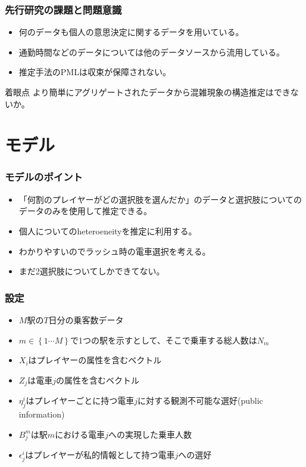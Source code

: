 \documentclass[dvipdfmx, 12pt]{beamer}
\begin{document}
\begin{frame}\frametitle{先行研究の課題と問題意識}
	\begin{itemize}
		\item 何のデータも個人の意思決定に関するデータを用いている。
		\item 通勤時間などのデータについては他のデータソースから流用している。
		\item 推定手法のPMLは収束が保障されない。
	\end{itemize}
	
	\begin{itembox}[l]{着眼点}
	より簡単にアグリゲートされたデータから混雑現象の構造推定はできないか。
	\end{itembox}
\end{frame}


\section{モデル}
\begin{frame}\frametitle{モデルのポイント}
	\begin{itemize}
		\item 「何割のプレイヤーがどの選択肢を選んだか」のデータと選択肢についてのデータのみを使用して推定できる。
		\item 個人についてのheteroeneityを推定に利用する。
		\item わかりやすいのでラッシュ時の電車選択を考える。
		\item まだ2選択肢についてしかできてない。
	\end{itemize}
\end{frame}

\begin{frame}\frametitle{設定}
	\begin{itemize}
		\item $M$駅の$T$日分の乗客数データ
		\item $m \in \left\{1\cdots M \right\}$で1つの駅を示すとして、そこで乗車する総人数は$N_m$
		\item $X_i$はプレイヤーの属性を含むベクトル
		\item $Z_j$は電車$j$の属性を含むベクトル
		\item $\eta_j^i$はプレイヤーごとに持つ電車$j$に対する観測不可能な選好(public information)
		\item $B_j^m$は駅$m$における電車$j$への実現した乗車人数
		\item $\epsilon_j^i$はプレイヤーが私的情報として持つ電車$j$への選好
	\end{itemize}
\end{frame}
\end{document}
